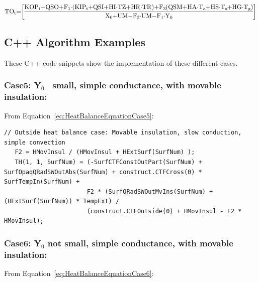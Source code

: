 \begin{equation}
\medmuskip=0mu
\thinmuskip=0mu
\thickmuskip=0mu
\nulldelimiterspace=0pt
\scriptspace=0pt
{\rm{T}}{{\rm{O}}_{\rm{t}}}{\rm{ = }}\left[ {\frac{{{\rm{KO}}{{\rm{P}}_{\rm{t}}} + {\rm{QSO}} + {{\rm{F}}_1}\cdot \left( {{\rm{KI}}{{\rm{P}}_{\rm{t}}}{\rm{ + QSI + HI}}\cdot {\rm{TZ + HR}}\cdot {\rm{TR}}} \right){\rm{ + }}{{\rm{F}}_{\rm{3}}}\left( {{\rm{QSM + HA}}\cdot {{\rm{T}}_{\rm{a}}}{\rm{ + HS}}\cdot {{\rm{T}}_{\rm{s}}}{\rm{ + HG}}\cdot {{\rm{T}}_{\rm{g}}}} \right)}}{{{{\rm{X}}_{\rm{0}}}{\rm{ + UM - }}{{\rm{F}}_{\rm{3}}}\cdot {\rm{UM - }}{{\rm{F}}_{\rm{1}}}\cdot {{\rm{Y}}_{\rm{0}}}}}} \right]{\rm{  }}
\label{eq:HeatBalanceEquationCase8}
\end{equation}

\subsection{C++ Algorithm Examples}\label{c++-algorithm-examples}

These C++ code snippets show the implementation of these different cases.

\subsubsection{Case5: Y\(_{0}\)~ small, simple conductance, with movable insulation:}\label{case5-yux5f0-small-simple-conductance-with-movable-insulation-1}

From Equation~\ref{eq:HeatBalanceEquationCase5}:

\begin{lstlisting}
// Outside heat balance case: Movable insulation, slow conduction, simple convection
   F2 = HMovInsul / (HMovInsul + HExtSurf(SurfNum) );
   TH(1, 1, SurfNum) = (-SurfCTFConstOutPart(SurfNum) + SurfOpaqQRadSWOutAbs(SurfNum) + construct.CTFCross(0) * SurfTempIn(SurfNum) +
                       F2 * (SurfQRadSWOutMvIns(SurfNum) + (HExtSurf(SurfNum)) * TempExt) /
                       (construct.CTFOutside(0) + HMovInsul - F2 * HMovInsul);
\end{lstlisting}

\subsubsection{Case6: Y\(_{0}\) not small, simple conductance, with movable insulation:}\label{case6-yux5f0-not-small-simple-conductance-with-movable-insulation-1}

From Equation~\ref{eq:HeatBalanceEquationCase6}:

